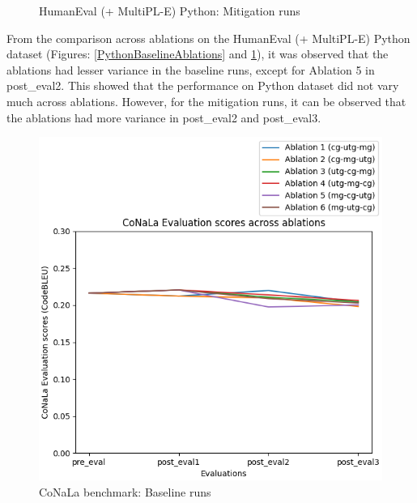\begin{figure}[H]
\begin{minipage}{0.45\textwidth}
        \captionsetup{width=1.1\textwidth}
        \caption{HumanEval (+ MultiPL-E) Python: Mitigation runs}
        \label{PythonMitigationAblations}
    \end{minipage}
\end{figure}
From the comparison across ablations on the HumanEval (+ MultiPL-E) Python dataset (Figures: \ref{PythonBaselineAblations} and \ref{PythonMitigationAblations}), it was observed that the ablations had lesser variance in the baseline runs, except for Ablation 5 in post\_eval2. This showed that the performance on Python dataset did not vary much across ablations. However, for the mitigation runs, it can be observed that the ablations had more variance in post\_eval2 and post\_eval3.

\begin{figure}[H]
    \centering
    \begin{minipage}{0.45\textwidth}
        \centering
        \includegraphics[width=1.1\textwidth]{Figures/results/code_baseline_graphs/conala/seed_averaged_conala_eval_baseline.png} %
        \captionsetup{width=1.1\textwidth}
        \caption{CoNaLa benchmark: Baseline runs}
        \label{ConalaBaselineAblation}
    \end{minipage}\hfill
    \begin{minipage}{0.45\textwidth}

\end{minipage}
\end{figure}
